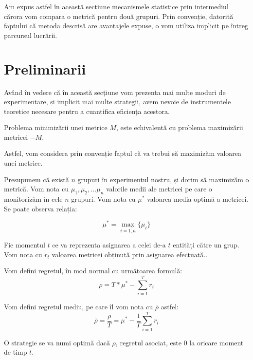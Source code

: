 Am expus astfel în această secțiune mecanismele statistice prin intermediul cărora vom compara o metrică pentru două grupuri. Prin convenție, datorită faptului că metoda descrisă are avantajele expuse, o vom utiliza implicit pe întreg parcursul lucrării.

\section{Preliminarii}

Având în vedere că în această secțiune vom prezenta mai multe moduri de experimentare, și implicit mai multe strategii, avem nevoie de instrumentele teoretice necesare pentru a cuantifica eficiența acestora.

\begin{remark}
	Problema minimizării unei metrice $M$, este echivalentă cu problema maximizării metricei $-M$.
\end{remark}

Astfel, vom considera prin convenție faptul că va trebui să maximizăm valoarea unei metrice.


Presupunem că există $n$ grupuri în experimentul nostru, și dorim să maximizăm o metrică. Vom nota cu $\mu_1, \mu_2, ... \mu_n$ valorile medii ale metricei pe care o monitorizăm în cele $n$ grupuri. Vom nota cu $\mu^*$ valoarea media optimă a metricei. Se poate observa relația:

\[
\mu^* = \max_{i = \overline{1, n}}\{\mu_i\}
\]

Fie momentul $t$ ce va reprezenta asignarea a celei de-a $t$ entități către un grup. Vom nota cu $r_t$ valoarea metricei obținută prin asignarea efectuată..

\begin{definition}
\label{regret}
Vom defini regretul, în mod normal cu următoarea formulă: 
\[
\rho = T * \mu^* - \sum_{i = 1}^{T}{r_i}
\]
\end{definition}

\begin{definition}
\label{regretaverage}
	Vom defini regretul mediu, pe care îl vom nota cu $\overline{\rho}$ astfel:
	\[
	\overline{\rho} = \frac{\rho}{T} = \mu^* - \frac{1}{T}\sum_{i = 1}^{T}{r_i}
	\]
\end{definition}

\begin{definition}
	O strategie se va numi optimă dacă $\rho$, regretul asociat, este 0 la oricare moment de timp $t$.
\end{definition}

